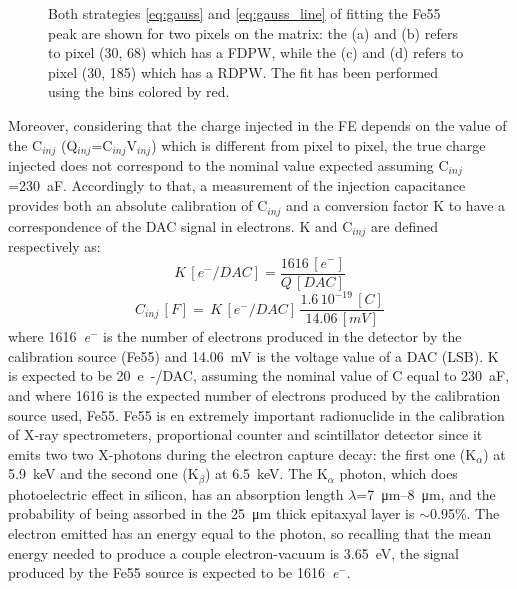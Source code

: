 \begin{figure}
\begin{subfigure}[b]{0.49\textwidth}
                \caption{}
                \label{fig:gauss_line_c185}
            \end{subfigure}
            \caption{Both strategies \ref{eq:gauss} and \ref{eq:gauss_line} of fitting the Fe55 peak are shown for two pixels on the matrix: the (a) and (b) refers to pixel (30, 68) which has a FDPW, while the (c) and (d) refers to pixel (30, 185) which has a RDPW. The fit has been performed using the bins colored by red.}
            \label{fig:Fe55_spectrum_pixels}
       \end{figure}

        Moreover, considering that the charge injected in the FE depends on the value of the C$_{inj}$ (Q$_{inj}$=C$_{inj}$V$_{inj}$) which is different from pixel to pixel, the true charge injected does not correspond to the nominal value expected assuming C$_{inj}$=\SI{230}{aF}.
        Accordingly to that, a measurement of the injection capacitance provides both an absolute calibration of C$_{inj}$ and a conversion factor K to have a correspondence of the DAC signal in electrons. 
        K and C$_{inj}$ are defined respectively as:
        \begin{equation}
            K\, [\si{\elementarycharge}^-/\si{DAC}] = \frac{1616\,[\si{\elementarycharge}^-]}{Q\,[\si{DAC}]}
        \end{equation}
        \begin{equation}
            C_{inj}\,[\si{F}] =\, K\,[\si{\elementarycharge}^-/\si{DAC}] \, \frac{1.6\,10^{-19}\,[\si{C}]}{14.06\,[\si{mV}]}
        \end{equation}
        where \SI{1616}{\elementarycharge}$^-$ is the number of electrons produced in the detector by the calibration source (Fe55) and \SI{14.06}{mV} is the voltage value of a DAC (LSB). 
        K is expected to be \SI{20}{e-/DAC}, assuming the nominal value of C equal to \SI{230}{aF}, and where 1616 is the expected number of electrons produced by the calibration source used, Fe55. Fe55 is en extremely important radionuclide in the calibration of X-ray spectrometers, proportional counter and scintillator detector since it emits two two X-photons during the electron capture decay: the first one (K$_\alpha$) at \SI{5.9}{keV} and the second one (K$_\beta$) at \SI{6.5}{keV}.
        The K$_\alpha$ photon, which does photoelectric effect in silicon, has an absorption length $\lambda$=\SIrange{7}{8}{\um}, and the probability of being assorbed in the \SI{25}{\um} thick epitaxyal layer is $\sim$0.95\%.
        The electron emitted has an energy equal to the photon, so recalling that the mean energy needed to produce a couple electron-vacuum is \SI{3.65}{eV}, the signal produced by the Fe55 source is expected to be \SI{1616}{\elementarycharge}$^-$.

